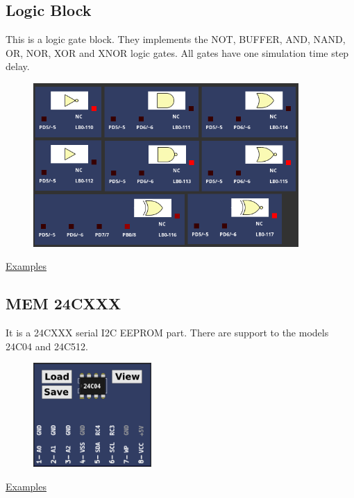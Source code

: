 \subsection{Logic Block}

This is a logic gate block. They implements the NOT, BUFFER, AND, NAND, OR, NOR, XOR and XNOR 
logic gates. All gates have one simulation time step delay.   

\begin{figure}[H]
\center
\includegraphics[width=0.9\textwidth]{img/part_logicblock.png} 
\end{figure}

\href{https://lcgamboa.github.io/picsimlab_examples/parts_Logic_Block.html}{Examples}


\subsection{MEM 24CXXX}

It is a 24CXXX serial I2C EEPROM part. There are support to the models 24C04 and 24C512.

\begin{figure}[H]
\center
\includegraphics[width=0.4\textwidth]{img/part_mem24xx.png} 
\end{figure}

\href{https://lcgamboa.github.io/picsimlab_examples/parts_MEM_24CXXX.html}{Examples}


